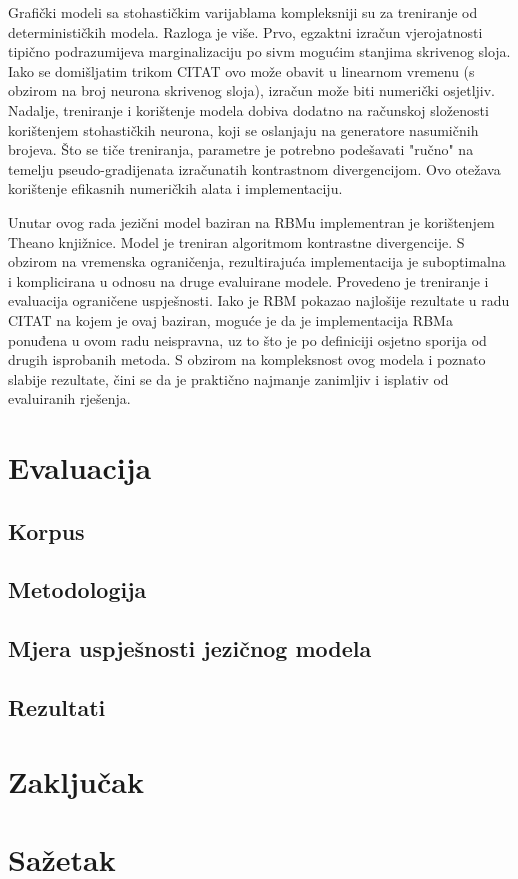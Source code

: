 \documentclass[times, utf8, diplomski, numeric]{fer}
\begin{document}
Grafički modeli sa stohastičkim varijablama kompleksniji su za treniranje od determinističkih modela. Razloga je više. Prvo, egzaktni izračun vjerojatnosti tipično podrazumijeva marginalizaciju po sivm mogućim stanjima skrivenog sloja. Iako se domišljatim trikom CITAT ovo može obavit u linearnom vremenu (s obzirom na broj neurona skrivenog sloja), izračun može biti numerički osjetljiv. Nadalje, treniranje i korištenje modela dobiva dodatno na računskoj složenosti korištenjem stohastičkih neurona, koji se oslanjaju na generatore nasumičnih brojeva. Što se tiče treniranja, parametre je potrebno podešavati "ručno" na temelju pseudo-gradijenata izračunatih kontrastnom divergencijom. Ovo otežava korištenje efikasnih numeričkih alata i implementaciju.

Unutar ovog rada jezični model baziran na RBMu implementran je korištenjem Theano knjižnice. Model je treniran algoritmom kontrastne divergencije. S obzirom na vremenska ograničenja, rezultirajuća implementacija je suboptimalna i komplicirana u odnosu na druge evaluirane modele. Provedeno je treniranje i evaluacija ograničene uspješnosti. Iako je RBM pokazao najlošije rezultate u radu CITAT na kojem je ovaj baziran, moguće je da je implementacija RBMa ponuđena u ovom radu neispravna, uz to što je po definiciji osjetno sporija od drugih isprobanih metoda. S obzirom na kompleksnost ovog modela i poznato slabije rezultate, čini se da je praktično najmanje zanimljiv i isplativ od evaluiranih rješenja.

\chapter{Evaluacija}

\section{Korpus}

\section{Metodologija}

\section{Mjera uspješnosti jezičnog modela}

\section{Rezultati}

\chapter{Zaključak} 




\chapter{Sažetak}
\end{document}
